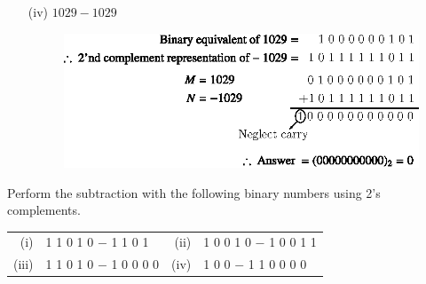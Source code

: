 \begin{solution}
\begin{itemize}
\item[(iv)] $1029-1029$
\begin{figure}[H]
\centering
\includegraphics{chap5/div41.eps}
\end{figure}
\end{itemize}
\end{solution}

\begin{problem}\label{prob5.31}
Perform the subtraction with the following binary numbers using 2's complements.
\begin{center}
\begin{tabular}{r@{\;\,}l@{\qquad\quad}r@{\;\,}l}
(i) & 1 1 0 1 0 $-$ 1 1 0 1 & (ii) & 1 0 0 1 0 $-$ 1 0 0 1 1\\[3pt]
(iii) & 1 1 0 1 0 $-$ 1 0 0 0 0 & (iv) & 1 0 0 $-$ 1 1 0 0 0 0
\end{tabular}
\end{center}
\end{problem}

